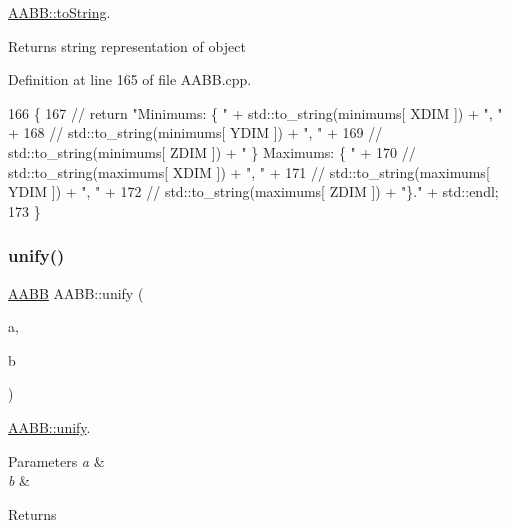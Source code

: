 \hyperlink{class_a_a_b_b_af66da47bd15d679936e05af231b45b75}{A\+A\+B\+B\+::to\+String}. 

\begin{DoxyReturn}{Returns}
string representation of object 
\end{DoxyReturn}


Definition at line 165 of file A\+A\+B\+B.\+cpp.


\begin{DoxyCode}
166 \{
167 \textcolor{comment}{//    return "Minimums: \{ " +  std::to\_string(minimums[ XDIM ])  + ", " +}
168 \textcolor{comment}{//            std::to\_string(minimums[ YDIM ])  + ", " +}
169 \textcolor{comment}{//            std::to\_string(minimums[ ZDIM ])  + " \} Maximums: \{ " +}
170 \textcolor{comment}{//            std::to\_string(maximums[ XDIM ])  + ", " +}
171 \textcolor{comment}{//            std::to\_string(maximums[ YDIM ])  + ", " +}
172 \textcolor{comment}{//            std::to\_string(maximums[ ZDIM ])  + "\}." + std::endl;}
173 \}
\end{DoxyCode}
\mbox{\label{class_a_a_b_b_a30a3b5591ad161fe88f9aaf51cf3da64}} 
\subsubsection{\texorpdfstring{unify()}{unify()}}
{\footnotesize\ttfamily \hyperlink{class_a_a_b_b}{A\+A\+BB} A\+A\+B\+B\+::unify (\begin{DoxyParamCaption}\item[{\hyperlink{class_a_a_b_b}{A\+A\+BB} $\ast$}]{a,  }\item[{\hyperlink{class_a_a_b_b}{A\+A\+BB} $\ast$}]{b }\end{DoxyParamCaption})\hspace{0.3cm}{\ttfamily [static]}}



\hyperlink{class_a_a_b_b_a30a3b5591ad161fe88f9aaf51cf3da64}{A\+A\+B\+B\+::unify}. 


\begin{DoxyParams}{Parameters}
{\em a} & \\
\hline
{\em b} & \\
\hline
\end{DoxyParams}
\begin{DoxyReturn}{Returns}

\end{DoxyReturn}


